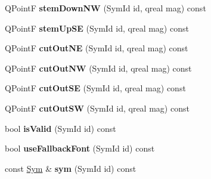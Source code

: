 \begin{DoxyCompactItemize}
Q\+PointF {\bfseries stem\+Down\+NW} (Sym\+Id id, qreal mag) const
\item 
\mbox{\label{class_ms_1_1_score_font_a33879da00970104e9d68ad2de4386fd5}} 
Q\+PointF {\bfseries stem\+Up\+SE} (Sym\+Id id, qreal mag) const
\item 
\mbox{\label{class_ms_1_1_score_font_ac1ee7f1f093a17c29148ab5551ffe58d}} 
Q\+PointF {\bfseries cut\+Out\+NE} (Sym\+Id id, qreal mag) const
\item 
\mbox{\label{class_ms_1_1_score_font_a3fe61b58b59d683d7bc65a9c9b054ed3}} 
Q\+PointF {\bfseries cut\+Out\+NW} (Sym\+Id id, qreal mag) const
\item 
\mbox{\label{class_ms_1_1_score_font_a86e7f16846da7e73ca0ca512533dd59d}} 
Q\+PointF {\bfseries cut\+Out\+SE} (Sym\+Id id, qreal mag) const
\item 
\mbox{\label{class_ms_1_1_score_font_ac918d06b7eee5b69878d9ec6f47c2d5f}} 
Q\+PointF {\bfseries cut\+Out\+SW} (Sym\+Id id, qreal mag) const
\item 
\mbox{\label{class_ms_1_1_score_font_a6977ea656ea62c2d0a20faa1c53f9b84}} 
bool {\bfseries is\+Valid} (Sym\+Id id) const
\item 
\mbox{\label{class_ms_1_1_score_font_ab53663288e9329b4b6c02ecf986bbefa}} 
bool {\bfseries use\+Fallback\+Font} (Sym\+Id id) const
\item 
\mbox{\label{class_ms_1_1_score_font_a76f8b3c7161c6561165b6971abd21611}} 
const \hyperlink{class_ms_1_1_sym}{Sym} \& {\bfseries sym} (Sym\+Id id) const
\end{DoxyCompactItemize}

